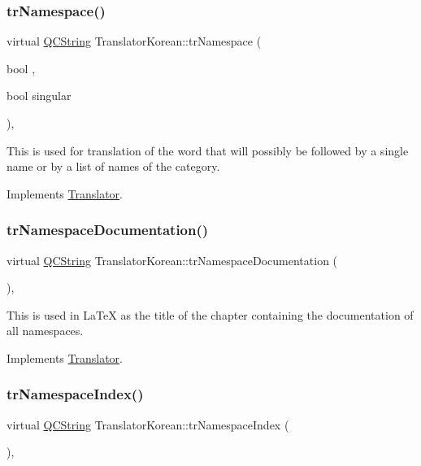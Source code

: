 \subsubsection{\texorpdfstring{trNamespace()}{trNamespace()}}
{\footnotesize\ttfamily virtual \mbox{\hyperlink{class_q_c_string}{Q\+C\+String}} Translator\+Korean\+::tr\+Namespace (\begin{DoxyParamCaption}\item[{bool}]{,  }\item[{bool}]{singular }\end{DoxyParamCaption})\hspace{0.3cm}{\ttfamily [inline]}, {\ttfamily [virtual]}}

This is used for translation of the word that will possibly be followed by a single name or by a list of names of the category. 

Implements \mbox{\hyperlink{class_translator}{Translator}}.

\mbox{\label{class_translator_korean_a42750039cd92218dd88247dd2383d936}} 
\subsubsection{\texorpdfstring{trNamespaceDocumentation()}{trNamespaceDocumentation()}}
{\footnotesize\ttfamily virtual \mbox{\hyperlink{class_q_c_string}{Q\+C\+String}} Translator\+Korean\+::tr\+Namespace\+Documentation (\begin{DoxyParamCaption}{ }\end{DoxyParamCaption})\hspace{0.3cm}{\ttfamily [inline]}, {\ttfamily [virtual]}}

This is used in La\+TeX as the title of the chapter containing the documentation of all namespaces. 

Implements \mbox{\hyperlink{class_translator}{Translator}}.

\mbox{\label{class_translator_korean_a6f5dc9bca3b4f39e532cbcc23e3c1cee}} 
\subsubsection{\texorpdfstring{trNamespaceIndex()}{trNamespaceIndex()}}
{\footnotesize\ttfamily virtual \mbox{\hyperlink{class_q_c_string}{Q\+C\+String}} Translator\+Korean\+::tr\+Namespace\+Index (\begin{DoxyParamCaption}{ }\end{DoxyParamCaption})\hspace{0.3cm}{\ttfamily [inline]}, {\ttfamily [virtual]}}

